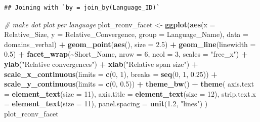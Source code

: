 \documentclass[
]{article}
\newenvironment{Shaded}{\begin{snugshade}}{\end{snugshade}}
\newcommand{\AttributeTok}[1]{\textcolor[rgb]{0.13,0.29,0.53}{#1}}
\newcommand{\CommentTok}[1]{\textcolor[rgb]{0.56,0.35,0.01}{\textit{#1}}}
\newcommand{\DecValTok}[1]{\textcolor[rgb]{0.00,0.00,0.81}{#1}}
\newcommand{\FloatTok}[1]{\textcolor[rgb]{0.00,0.00,0.81}{#1}}
\newcommand{\FunctionTok}[1]{\textcolor[rgb]{0.13,0.29,0.53}{\textbf{#1}}}
\newcommand{\NormalTok}[1]{#1}
\newcommand{\OtherTok}[1]{\textcolor[rgb]{0.56,0.35,0.01}{#1}}
\newcommand{\SpecialCharTok}[1]{\textcolor[rgb]{0.81,0.36,0.00}{\textbf{#1}}}
\newcommand{\StringTok}[1]{\textcolor[rgb]{0.31,0.60,0.02}{#1}}
\begin{document}
\begin{verbatim}
## Joining with `by = join_by(Language_ID)`
\end{verbatim}

\begin{Shaded}
\begin{Highlighting}[]
\CommentTok{\# make dot plot per language}
\NormalTok{plot\_rconv\_facet }\OtherTok{\textless{}{-}} \FunctionTok{ggplot}\NormalTok{(}\FunctionTok{aes}\NormalTok{(}\AttributeTok{x =}\NormalTok{ Relative\_Size, }\AttributeTok{y =}\NormalTok{ Relative\_Convergence, }\AttributeTok{group =}\NormalTok{ Language\_Name), }\AttributeTok{data =}\NormalTok{ domains\_verbal) }\SpecialCharTok{+}
  \FunctionTok{geom\_point}\NormalTok{(}\FunctionTok{aes}\NormalTok{(), }\AttributeTok{size =} \FloatTok{2.5}\NormalTok{) }\SpecialCharTok{+}
  \FunctionTok{geom\_line}\NormalTok{(}\AttributeTok{linewidth =} \FloatTok{0.5}\NormalTok{) }\SpecialCharTok{+}
  \FunctionTok{facet\_wrap}\NormalTok{(}\SpecialCharTok{\textasciitilde{}}\NormalTok{Short\_Name, }\AttributeTok{nrow =} \DecValTok{6}\NormalTok{, }\AttributeTok{ncol =} \DecValTok{3}\NormalTok{, }\AttributeTok{scales =} \StringTok{"free\_x"}\NormalTok{) }\SpecialCharTok{+}
  \FunctionTok{ylab}\NormalTok{(}\StringTok{"Relative convergences"}\NormalTok{) }\SpecialCharTok{+}
  \FunctionTok{xlab}\NormalTok{(}\StringTok{"Relative span size"}\NormalTok{) }\SpecialCharTok{+}
  \FunctionTok{scale\_x\_continuous}\NormalTok{(}\AttributeTok{limits =} \FunctionTok{c}\NormalTok{(}\DecValTok{0}\NormalTok{, }\DecValTok{1}\NormalTok{), }\AttributeTok{breaks =} \FunctionTok{seq}\NormalTok{(}\DecValTok{0}\NormalTok{, }\DecValTok{1}\NormalTok{, }\FloatTok{0.25}\NormalTok{)) }\SpecialCharTok{+}
  \FunctionTok{scale\_y\_continuous}\NormalTok{(}\AttributeTok{limits =} \FunctionTok{c}\NormalTok{(}\DecValTok{0}\NormalTok{, }\FloatTok{0.5}\NormalTok{)) }\SpecialCharTok{+}
  \FunctionTok{theme\_bw}\NormalTok{() }\SpecialCharTok{+}
  \FunctionTok{theme}\NormalTok{(}
    \AttributeTok{axis.text =} \FunctionTok{element\_text}\NormalTok{(}\AttributeTok{size =} \DecValTok{11}\NormalTok{),}
    \AttributeTok{axis.title =} \FunctionTok{element\_text}\NormalTok{(}\AttributeTok{size =} \DecValTok{12}\NormalTok{),}
    \AttributeTok{strip.text.x =} \FunctionTok{element\_text}\NormalTok{(}\AttributeTok{size =} \DecValTok{11}\NormalTok{),}
    \AttributeTok{panel.spacing =} \FunctionTok{unit}\NormalTok{(}\FloatTok{1.2}\NormalTok{, }\StringTok{"lines"}\NormalTok{)}
\NormalTok{  )}
\NormalTok{plot\_rconv\_facet}
\end{Highlighting}
\end{Shaded}
\end{document}
